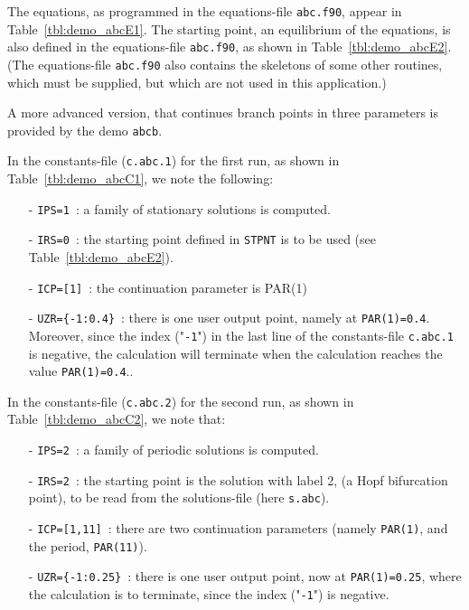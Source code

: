 \documentclass[12pt]{report}
\begin{document}
The equations, as programmed in the equations-file {\tt abc.f90},
appear in Table~\ref{tbl:demo_abcE1}.
The starting point, an equilibrium of the equations,
is also defined in  the equations-file {\tt abc.f90},
as shown in  Table~\ref{tbl:demo_abcE2}.
(The equations-file {\tt abc.f90} also contains the skeletons
of some other routines, which must be supplied, but which 
are not used in this application.)

A more advanced version, that continues branch points in three
parameters is provided by the demo {\tt abcb}.

In the constants-file ({\tt c.abc.1}) for the first run, as shown in 
Table~\ref{tbl:demo_abcC1}, we note the following:

\begin{itemize}
\item[-] {\tt IPS=1}~: a family of stationary solutions is computed.

\item[-] {\tt IRS=0}~: the starting point defined in {\tt STPNT} 
	 is to be used (see  Table~\ref{tbl:demo_abcE2}). 

\item[-] {\tt ICP=[1]}~: the continuation parameter is PAR(1) 

\item[-] {\tt UZR=\{-1:0.4\}}~: there is one user output point, namely at
	 {\tt PAR(1)=0.4}. Moreover, since the index ("{\tt -1}") in
	 the last line of the constants-file {\tt c.abc.1} is negative, 
	 the calculation will terminate when the calculation reaches
	 the value {\tt PAR(1)=0.4}..
\end{itemize}

In the constants-file ({\tt c.abc.2}) for the second run, as shown in 
Table~\ref{tbl:demo_abcC2}, we note that:

\begin{itemize}
\item[-] {\tt IPS=2}~: a family of periodic solutions is computed.

\item[-] {\tt IRS=2}~: the starting point is the solution with label 2,
         (a Hopf bifurcation point), to be read from the solutions-file 
	 (here {\tt s.abc}).

\item[-] {\tt ICP=[1,11]}~: there are two continuation parameters
	 (namely {\tt PAR(1)}, and the period, {\tt PAR(11)}). 

\item[-] {\tt UZR=\{-1:0.25\}}~: there is one user output point, now at
	 {\tt PAR(1)=0.25}, where the calculation is to terminate,
	 since the index ("{\tt -1}") is negative.
\end{itemize}
\end{document}
